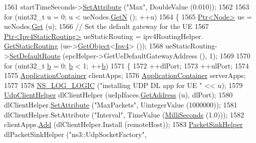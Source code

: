 \begin{DoxyCode}
1561   startTimeSeconds->\hyperlink{classns3_1_1ObjectBase_ac60245d3ea4123bbc9b1d391f1f6592f}{SetAttribute} (\textcolor{stringliteral}{"Max"}, DoubleValue (0.010));
1562 
1563   \textcolor{keywordflow}{for} (uint32\_t u = 0; u < ueNodes.\hyperlink{classns3_1_1NodeContainer_aed647ac56d0407a7706aba02eb44b951}{GetN} (); ++u)
1564     \{
1565       \hyperlink{classns3_1_1Ptr}{Ptr<Node>} ue = ueNodes.\hyperlink{classns3_1_1NodeContainer_a9ed96e2ecc22e0f5a3d4842eb9bf90bf}{Get} (u);
1566       \textcolor{comment}{// Set the default gateway for the UE}
1567       \hyperlink{classns3_1_1Ptr}{Ptr<Ipv4StaticRouting>} ueStaticRouting = ipv4RoutingHelper.
      \hyperlink{classns3_1_1Ipv4StaticRoutingHelper_a731206e50d305695dac7fb2ef963a4bb}{GetStaticRouting} (ue->\hyperlink{classns3_1_1Object_a13e18c00017096c8381eb651d5bd0783}{GetObject}<\hyperlink{classns3_1_1Ipv4}{Ipv4}> ());
1568       ueStaticRouting->\hyperlink{classns3_1_1Ipv4StaticRouting_aee30fa3246c2b42f122dabdff2725331}{SetDefaultRoute} (epcHelper->GetUeDefaultGatewayAddress (), 1);
1569 
1570       \textcolor{keywordflow}{for} (uint32\_t \hyperlink{buildings__pathloss_8m_a21ad0bd836b90d08f4cf640b4c298e7c}{b} = 0; \hyperlink{buildings__pathloss_8m_a21ad0bd836b90d08f4cf640b4c298e7c}{b} < 1; ++\hyperlink{buildings__pathloss_8m_a21ad0bd836b90d08f4cf640b4c298e7c}{b})
1571         \{
1572           ++dlPort;
1573           ++ulPort;
1574 
1575           \hyperlink{classns3_1_1ApplicationContainer}{ApplicationContainer} clientApps;
1576           \hyperlink{classns3_1_1ApplicationContainer}{ApplicationContainer} serverApps;
1577 
1578           \hyperlink{group__logging_ga88acd260151caf2db9c0fc84997f45ce}{NS\_LOG\_LOGIC} (\textcolor{stringliteral}{"installing UDP DL app for UE "} << u);
1579           \hyperlink{classns3_1_1UdpClientHelper}{UdpClientHelper} dlClientHelper (ueIpIfaces.\hyperlink{classns3_1_1Ipv4InterfaceContainer_ae63208dcd222be986822937ee4aa828c}{GetAddress} (u), dlPort);
1580           dlClientHelper.\hyperlink{classns3_1_1UdpClientHelper_a8bbae16a28f85ab3f3b5aa4642edfeae}{SetAttribute} (\textcolor{stringliteral}{"MaxPackets"}, UintegerValue (1000000));
1581           dlClientHelper.SetAttribute (\textcolor{stringliteral}{"Interval"}, TimeValue (\hyperlink{group__timecivil_gaf26127cf4571146b83a92ee18679c7a9}{MilliSeconds} (1.0)));
1582           clientApps.\hyperlink{classns3_1_1ApplicationContainer_ad09ab1a1ad5849d518d5f4c262e38152}{Add} (dlClientHelper.Install (remoteHost));
1583           \hyperlink{classns3_1_1PacketSinkHelper}{PacketSinkHelper} dlPacketSinkHelper (\textcolor{stringliteral}{"ns3::UdpSocketFactory"},

\end{DoxyCode}
